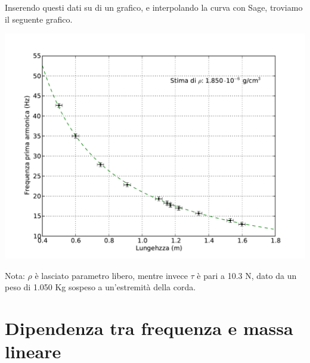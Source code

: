 Inserendo questi dati su di un grafico, e interpolando la curva con Sage, troviamo il seguente grafico.

\includegraphics[scale=0.75]{"../grafici/CordaPrimaArmonica"}

Nota: $\rho$ è lasciato parametro libero, mentre invece $\tau$ è pari a 10.3 N, dato da un peso di 1.050 Kg sospeso a un'estremità della corda.

\section{Dipendenza tra frequenza e massa lineare}
